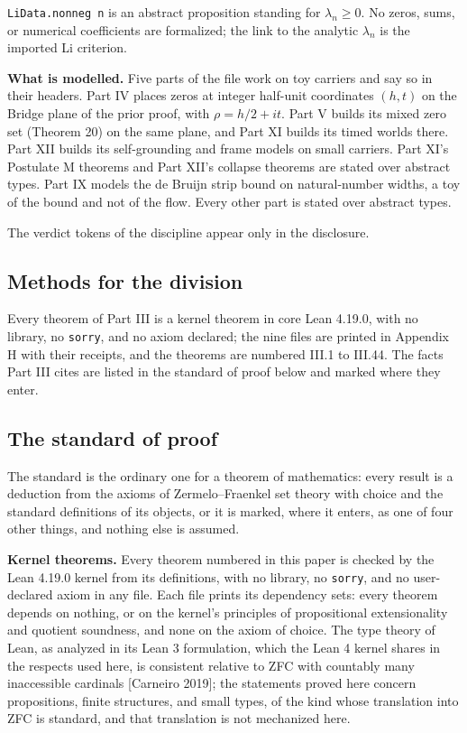 \documentclass[10pt]{article}
\begin{document}
\texttt{LiData.nonneg\ n} is an abstract proposition standing for
\(\lambda_n \geq 0\). No zeros, sums, or numerical coefficients are
formalized; the link to the analytic \(\lambda_n\) is the imported Li
criterion.

\textbf{What is modelled.} Five parts of the file work on toy carriers
and say so in their headers. Part IV places zeros at integer half-unit
coordinates \((h, t)\) on the Bridge plane of the prior proof, with
\(\rho = h/2 + it\). Part V builds its mixed zero set (Theorem 20) on
the same plane, and Part XI builds its timed worlds there. Part XII
builds its self-grounding and frame models on small carriers. Part XI's
Postulate M theorems and Part XII's collapse theorems are stated over
abstract types. Part IX models the de Bruijn strip bound on
natural-number widths, a toy of the bound and not of the flow. Every
other part is stated over abstract types.

The verdict tokens of the discipline appear only in the disclosure.

\hypertarget{methods-for-the-division}{%
\subsection{Methods for the division}\label{methods-for-the-division}}

Every theorem of Part III is a kernel theorem in core Lean 4.19.0, with
no library, no \texttt{sorry}, and no axiom declared; the nine files are
printed in Appendix H with their receipts, and the theorems are numbered
III.1 to III.44. The facts Part III cites are listed in the standard of
proof below and marked where they enter.

\hypertarget{the-standard-of-proof}{%
\subsection{The standard of proof}\label{the-standard-of-proof}}

The standard is the ordinary one for a theorem of mathematics: every
result is a deduction from the axioms of Zermelo--Fraenkel set theory
with choice and the standard definitions of its objects, or it is
marked, where it enters, as one of four other things, and nothing else
is assumed.

\textbf{Kernel theorems.} Every theorem numbered in this paper is
checked by the Lean 4.19.0 kernel from its definitions, with no library,
no \texttt{sorry}, and no user-declared axiom in any file. Each file
prints its dependency sets: every theorem depends on nothing, or on the
kernel's principles of propositional extensionality and quotient
soundness, and none on the axiom of choice. The type theory of Lean, as
analyzed in its Lean 3 formulation, which the Lean 4 kernel shares in
the respects used here, is consistent relative to ZFC with countably
many inaccessible cardinals {[}Carneiro 2019{]}; the statements proved
here concern propositions, finite structures, and small types, of the
kind whose translation into ZFC is standard, and that translation is not
mechanized here.
\end{document}
